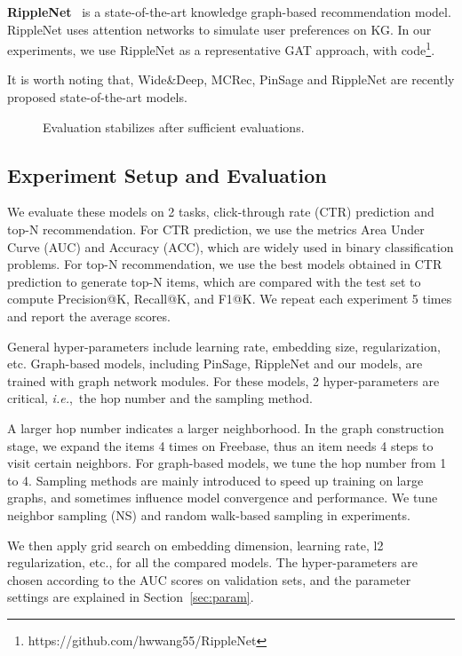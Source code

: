 \documentclass[sigconf]{acmart}
\newcommand{\ie}{\emph{i.e.},~}
\begin{document}
\textbf{RippleNet}~\cite{wang2018ripplenet} is a state-of-the-art knowledge graph-based recommendation model. RippleNet uses attention networks to simulate user preferences on KG. In our experiments, we use RippleNet as a representative  GAT approach, with code\footnote{https://github.com/hwwang55/RippleNet}.

It is worth noting that, Wide\&Deep, MCRec, PinSage and RippleNet are recently proposed state-of-the-art models.

\begin{figure}
    \caption{Evaluation stabilizes after sufficient evaluations.} \label{fig:n_eval}
\end{figure}

\subsection{Experiment Setup and Evaluation}

We evaluate these models on 2 tasks, click-through rate (CTR) prediction and top-N recommendation.
For CTR prediction, we use the metrics Area Under Curve (AUC) and Accuracy (ACC), which are widely used in binary classification problems.
For top-N recommendation, we use the best models obtained in CTR prediction to generate top-N items, which are compared with the test set to compute Precision@K, Recall@K, and F1@K.
We repeat each experiment 5 times and report the average scores.

General hyper-parameters include learning rate, embedding size, regularization, etc.
Graph-based models, including PinSage, RippleNet and our models, are trained with graph network modules.
For these models, 2 hyper-parameters are critical, \ie the hop number and the sampling method.

A larger hop number indicates a larger neighborhood.
In the graph construction stage, we expand the items 4 times on Freebase, thus an item needs 4 steps to visit certain neighbors.
For graph-based models, we tune the hop number from 1 to 4.
Sampling methods are mainly introduced to speed up training on large graphs, and sometimes influence model convergence and performance.
We tune neighbor sampling (NS) and random walk-based sampling in experiments. 

We then apply grid search on embedding dimension, learning rate, l2 regularization, etc.,  for all the compared models.
The hyper-parameters are chosen according to the AUC scores on validation sets, and the parameter settings are explained in Section~\ref{sec:param}.
\end{document}

